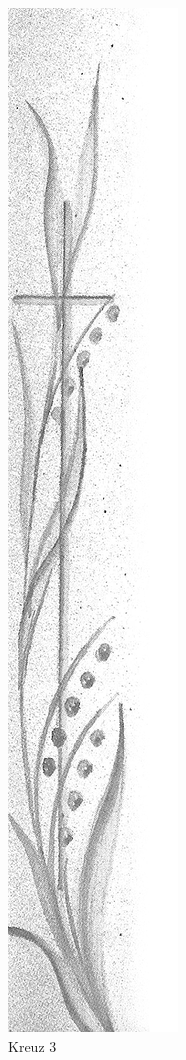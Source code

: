 \documentclass[ngerman,a4paper,11pt]{scrreprt}
\begin{document}
\begin{figure}[H]
\centering
\includegraphics[width=\textwidth,height=.8\textheight,keepaspectratio]{Bilder/Bilder/750_0010_15447_kreuz_pflanze.png}
\caption{\label{img_Kreuz_3}Kreuz 3}
\end{figure}
\end{document}
